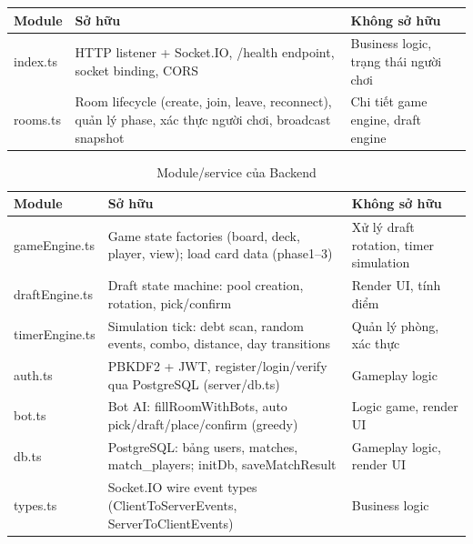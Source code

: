 \begin{table}[H]
    \centering
    \renewcommand{\arraystretch}{1.3}
    \setlength{\tabcolsep}{6pt}
    \begin{tabular}{|>{\RaggedRight\arraybackslash\ttfamily}p{3cm}|>{\RaggedRight\arraybackslash}p{7.5cm}|>{\RaggedRight\arraybackslash}p{5.5cm}|}
        \hline
        \rowcolor[rgb]{0.8, 0.9, 1.0}
        \textrm{\textbf{Module}} & \textbf{Sở hữu} & \textbf{Không sở hữu} \\ \hline

        index.ts & HTTP listener + Socket.IO, /health endpoint, socket binding, CORS & Business logic, trạng thái người chơi \\ \hline

        rooms.ts & Room lifecycle (create, join, leave, reconnect), quản lý phase, xác thực người chơi, broadcast snapshot & Chi tiết game engine, draft engine \\ \hline
    \end{tabular}
    \label{tab:backend_modules_p1}
\end{table}

\begin{table}[H]
    \centering
    \renewcommand{\arraystretch}{1.3}
    \setlength{\tabcolsep}{6pt}
    \begin{tabular}{|>{\RaggedRight\arraybackslash\ttfamily}p{3cm}|>{\RaggedRight\arraybackslash}p{7.5cm}|>{\RaggedRight\arraybackslash}p{5.5cm}|}
        \hline
        \rowcolor[rgb]{0.8, 0.9, 1.0}
        \textrm{\textbf{Module}} & \textbf{Sở hữu} & \textbf{Không sở hữu} \\ \hline
        gameEngine.ts & Game state factories (board, deck, player, view); load card data (phase1--3) & Xử lý draft rotation, timer simulation \\ \hline

        draftEngine.ts & Draft state machine: pool creation, rotation, pick/confirm & Render UI, tính điểm \\ \hline

        timerEngine.ts & Simulation tick: debt scan, random events, combo, distance, day transitions & Quản lý phòng, xác thực \\ \hline

        auth.ts & PBKDF2 + JWT, register/login/verify qua PostgreSQL (server/db.ts) & Gameplay logic \\ \hline

        bot.ts & Bot AI: fillRoomWithBots, auto pick/draft/place/confirm (greedy) & Logic game, render UI \\ \hline

        db.ts & PostgreSQL: bảng users, matches, match\_players; initDb, saveMatchResult & Gameplay logic, render UI \\ \hline

        types.ts & Socket.IO wire event types (ClientToServerEvents, ServerToClientEvents) & Business logic \\ \hline
    \end{tabular}
    \caption{Module/service của Backend}
    \label{tab:backend_modules_p1}
\end{table}
